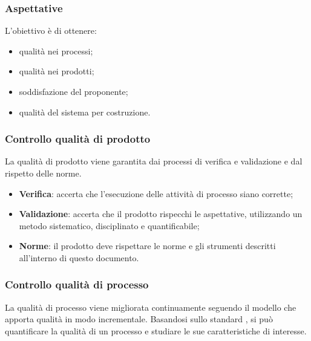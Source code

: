         \subsubsection{Aspettative}
        L'obiettivo è di ottenere:
        \begin{itemize}
            \item qualità nei processi;
            \item qualità nei prodotti;
            \item soddisfazione del proponente;
            \item qualità del sistema per costruzione.
        \end{itemize}
        
        \subsubsection{Controllo qualità di prodotto}
        La qualità di prodotto viene garantita dai processi di verifica e validazione e dal rispetto delle norme.
        \begin{itemize}
            \item \textbf{Verifica}: accerta che l'esecuzione delle attività di processo siano corrette;
            \item \textbf{Validazione}: accerta che il prodotto rispecchi le aspettative, utilizzando un metodo sistematico, disciplinato e quantificabile;
            \item \textbf{Norme}: il prodotto deve rispettare le norme e gli strumenti descritti all'interno di questo documento.
        \end{itemize}
        
        \subsubsection{Controllo qualità di processo}
        La qualità di processo viene migliorata continuamente seguendo il modello  che apporta qualità in modo incrementale.
        Basandosi sullo standard , si può quantificare la qualità di un processo e studiare le sue caratteristiche di interesse.
        
